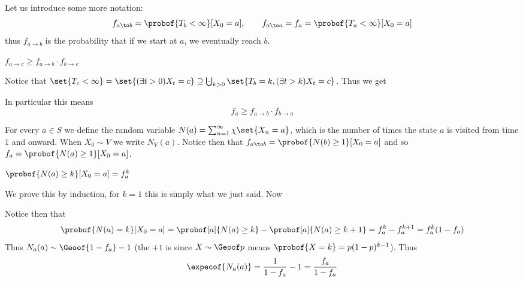 Let us introduce some more notation:
$$ f_{a\to b} = \probof{T_b<\infty}[X_0=a],\qquad f_{a\to a}=f_a=\probof{T_a<\infty}[X_0=a] $$
thus $f_{a\to b}$ is the probability that if we start at $a$, we eventually reach $b$.

\blemm

    $f_{a\to c}\geq f_{a\to b}\cdot f_{b\to c}$

\elemm

Notice that $\set{T_c<\infty}=\set{(\exists t>0)X_t=c}\supseteq\bigdcup_{k>0}\set{T_b=k,(\exists t>k)X_t=c}$.
Thus we get

In particular this means
$$ f_a\geq f_{a\to b}\cdot f_{b\to a} $$

For every $a\in S$ we define the random variable $N(a)=\sum_{n=1}^\infty\chi\set{X_n=a}$, which is the number of times the state $a$ is visited from time $1$ and onward.
When $X_0\sim V$ we write $N_V(a)$.
Notice then that $f_{a\to b}=\probof{N(b)\geq1}[X_0=a]$ and so $f_a=\probof{N(a)\geq1}[X_0=a]$.

\bprop

    $\probof{N(a)\geq k}[X_0=a]=f_a^k$

\eprop

We prove this by induction, for $k=1$ this is simply what we just said.
Now

Notice then that
$$ \probof{N(a)=k}[X_0=a] = \probof[a]{N(a)\geq k} - \probof[a]{N(a)\geq k+1} = f_a^k - f_a^{k+1} = f_a^k(1-f_a) $$
Thus $N_a(a)\sim\Geoof{1-f_a}-1$ (the $+1$ is since $X\sim\Geoof p$ means $\probof{X=k}=p(1-p)^{k-1}$).
Thus
$$ \expecof{N_a(a)} = \frac1{1-f_a} - 1 = \frac{f_a}{1-f_a} $$

